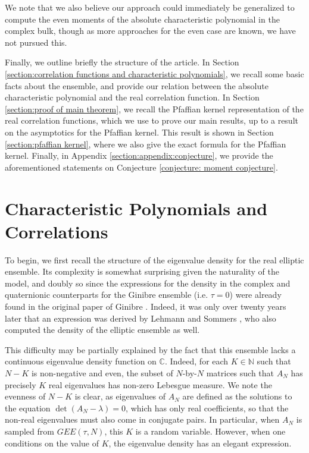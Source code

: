 \documentclass[12pt]{article}
\newcommand{\N}{\mathbb{N}}
\newcommand{\C}{\mathbb{C}}
\numberwithin{info}{section}
\numberwithin{equation}{section}
\renewcommand{\[}{\begin{equation}}
\renewcommand{\]}{\end{equation}}
\newcommand{\lam}{\lambda}
\newcommand{\<}{\langle}
\renewcommand{\>}{\rangle}
\begin{document}
	We note that we also believe our approach could immediately be generalized to compute the even moments of the absolute characteristic polynomial in the complex bulk, though as more approaches for the even case are known, we have not pursued this.
	
	Finally, we outline briefly the structure of the article. In Section \ref{section:correlation functions and characteristic polynomials}, we recall some basic facts about the ensemble, and provide our relation between the absolute characteristic polynomial and the real correlation function. In Section \ref{section:proof of main theorem}, we recall the Pfaffian kernel representation of the real correlation functions, which we use to prove our main results, up to a result on the asymptotics for the Pfaffian kernel. This result is shown in Section \ref{section:pfaffian kernel}, where we also give the exact formula for the Pfaffian kernel. Finally, in Appendix \ref{section:appendix:conjecture}, we provide the aforementioned statements on Conjecture \ref{conjecture: moment conjecture}.
	
	
	\section{Characteristic Polynomials and Correlations \label{section:correlation functions and characteristic polynomials}}
	
	To begin, we first recall the structure of the eigenvalue density for the real elliptic ensemble. Its complexity is somewhat surprising given the naturality of the model, and doubly so since the expressions for the density in the complex and quaternionic counterparts for the Ginibre ensemble (i.e. $\tau=0$) were already found in the original paper of Ginibre \cite{ginibre-12}. Indeed, it was only over twenty years later that an expression was derived by Lehmann and Sommers \cite{sommers-elliptic}, who also computed  the density of the elliptic ensemble as well.
	
	This difficulty may be partially explained by the fact that this ensemble lacks a continuous eigenvalue density function on $\C$. Indeed, for each $K\in \N$ such that $N-K$ is non-negative and even, the subset of $N$-by-$N$ matrices such that $A_{N}$ has precisely $K$ real eigenvalues has non-zero Lebesgue measure. We note the evenness of $N-K$ is clear, as eigenvalues of $A_N$ are defined as the solutions to the equation $\det(A_N-\lam)=0$, which has only real coefficients, so that the non-real eigenvalues must also come in conjugate pairs. In particular, when $A_N$ is sampled from $GEE(\tau,N)$, this $K$ is a random variable. However, when one conditions on the value of $K$, the eigenvalue density has an elegant expression.
	
\end{document}
